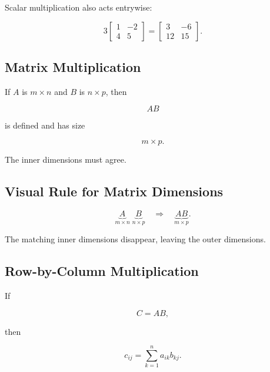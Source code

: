 Scalar multiplication also acts entrywise:

\[ 3\begin{bmatrix}1&-2\\4&5\end{bmatrix}
=
\begin{bmatrix}3&-6\\12&15\end{bmatrix}. \]

\subsection{Matrix Multiplication}
\label{subsec:matrix-multiplication}

If \(A\) is \(m\times n\) and \(B\) is \(n\times p\), then

\[ AB \]

is defined and has size

\[ m\times p. \]

The inner dimensions must agree.

\subsection{Visual Rule for Matrix Dimensions}
\label{subsec:matrix-dimension-visual}

\begin{center}
\[
\underbrace{A}_{m\times\boxed{n}}
\;
\underbrace{B}_{\boxed{n}\times p}
\quad\Longrightarrow\quad
\underbrace{AB}_{m\times p}.
\]
\end{center}

The matching inner dimensions disappear, leaving the outer dimensions.

\subsection{Row-by-Column Multiplication}
\label{subsec:row-column-multiplication}

If

\[ C=AB, \]

then

\[ c_{ij}=\sum_{k=1}^{n}a_{ik}b_{kj}. \]

